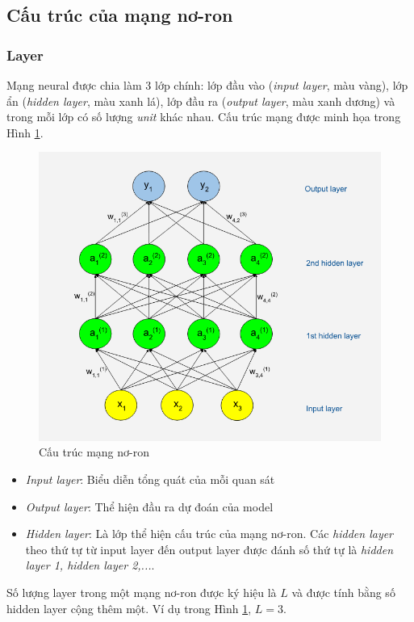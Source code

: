 \subsection{Cấu trúc của mạng nơ-ron}

\subsubsection{Layer}
\hspace{5mm} Mạng neural  được chia làm 3 lớp chính: lớp đầu vào (\textit{input layer}, màu vàng), lớp ẩn (\textit{hidden layer}, màu xanh lá), lớp đầu ra (\textit{output layer}, màu xanh dương) và trong mỗi lớp có số lượng \textit{unit} khác nhau. Cấu trúc mạng được minh họa trong Hình \ref{fig:neuralNetworkStruct}.
\begin{center}
 	\begin{figure}[htp]
    \begin{center}
     \includegraphics[scale=0.5]{chap3/image/cautrucNN.png}
    \end{center}
    \caption{Cấu trúc mạng nơ-ron}
    \label{fig:neuralNetworkStruct}
    \end{figure}
\end{center}

\begin{itemize}
\setlength{\itemindent}{5mm}
	\item \textit{Input layer}: Biểu diễn tổng quát của mỗi quan sát
	\item \textit{Output layer}: Thể hiện đầu ra dự đoán của model
	\item \textit{Hidden layer}: Là lớp thể hiện cấu trúc của mạng nơ-ron. Các \textit{hidden layer} theo thứ tự từ input layer đến output layer được đánh số thứ tự là \textit{hidden layer 1, hidden layer 2,...}.
\end{itemize}\par
Số lượng layer trong một mạng nơ-ron được ký hiệu là $L$ và được tính bằng số hidden layer cộng thêm một. Ví dụ trong Hình \ref{fig:neuralNetworkStruct}, $L=3$.
